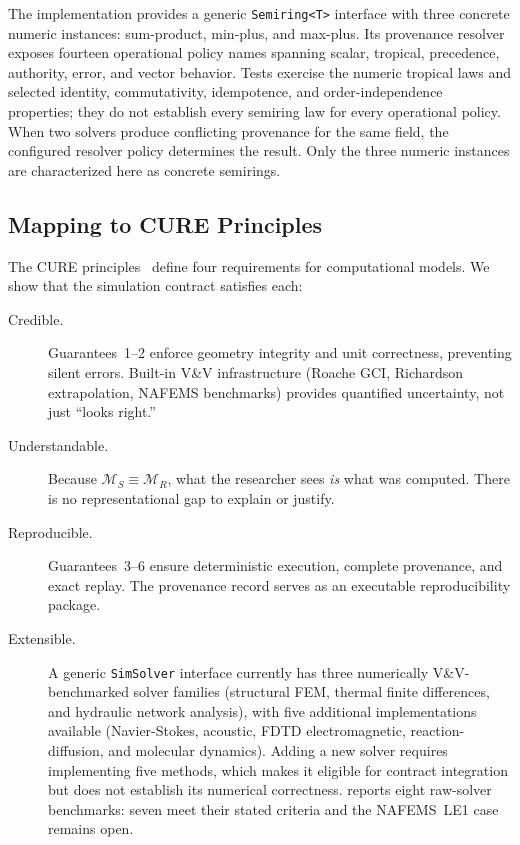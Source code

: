 \documentclass[journal]{IEEEtran}
\begin{document}
The implementation provides a generic \texttt{Semiring<T>} interface with
three concrete numeric instances: sum-product, min-plus, and max-plus. Its
provenance resolver exposes fourteen operational policy names spanning
scalar, tropical, precedence, authority, error, and vector behavior. Tests
exercise the numeric tropical laws and selected identity, commutativity,
idempotence, and order-independence properties; they do not establish every
semiring law for every operational policy. When two solvers produce
conflicting provenance for the same field, the configured resolver policy
determines the result. Only the three numeric instances are characterized
here as concrete semirings.


\subsection{Mapping to CURE Principles}
\label{sec:model:cure}

The CURE principles~\cite{CURE2026} define four requirements for
computational models. We show that the simulation contract satisfies each:

\begin{description}
  \item[Credible.] Guarantees~1--2 enforce geometry integrity and unit
    correctness, preventing silent errors. Built-in V\&V infrastructure
    (Roache GCI, Richardson extrapolation, NAFEMS benchmarks) provides
    quantified uncertainty, not just ``looks right.''
  \item[Understandable.] Because $\mathcal{M}_S \equiv \mathcal{M}_R$,
    what the researcher sees \emph{is} what was computed. There is no
    representational gap to explain or justify.
  \item[Reproducible.] Guarantees~3--6 ensure deterministic execution,
    complete provenance, and exact replay. The provenance record serves
    as an executable reproducibility package.
  \item[Extensible.] A generic \texttt{SimSolver} interface currently has
    three numerically V\&V-benchmarked solver families (structural FEM,
    thermal finite differences, and hydraulic network analysis), with five
    additional implementations available (Navier-Stokes, acoustic, FDTD
    electromagnetic, reaction-diffusion, and molecular dynamics). Adding a
    new solver requires implementing five methods, which makes it eligible
    for contract integration but does not establish its numerical
    correctness.  reports eight raw-solver benchmarks:
    seven meet their stated criteria and the NAFEMS~LE1 case remains open.
\end{description}
\end{document}
